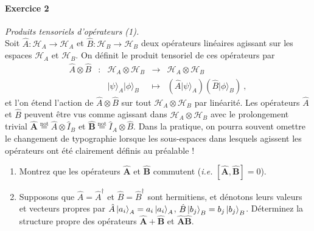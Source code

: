 \paragraph{Exercice 2} \textit{Produits tensoriels d'opérateurs (1).} \\
Soit $\hat A: \mathcal H_A \rightarrow \mathcal H_A$ et $\hat B: \mathcal H_B \rightarrow \mathcal H_B$ deux opérateurs linéaires agissant sur les espaces $\mathcal H_A$ et $\mathcal H_B$. On définit le produit tensoriel de ces opérateurs par
\begin{equation}
\begin{array}{ccccl}
\hat A \otimes \hat B &:& \mathcal H_A \otimes \mathcal H_B &\rightarrow& \mathcal H_A \otimes \mathcal H_B \\
& & \vert \psi \rangle_A \vert \phi \rangle_B &\mapsto &
\left( \hat A \vert \psi \rangle_A \right) \left( \hat B \vert \phi \rangle_B \right)\ , 
\end{array}
\end{equation}
et l'on étend l'action de $\hat A \otimes \hat B $ sur tout $\mathcal H_A \otimes \mathcal H_B $ par linéarité. Les opérateurs $\hat A$ et $\hat B$ peuvent être vus comme agissant dans $\mathcal H_A \otimes \mathcal H_B$ avec le prolongement trivial $\hat{\bm A} \stackrel{\text{not}}{=} \hat A \otimes \hat I_B$ et $\hat{\bm B} \stackrel{\text{not}}{=} \hat I_A \otimes \hat B$. Dans la pratique, on pourra souvent omettre le changement de typographie lorsque les sous-espaces dans lesquels agissent les opérateurs ont été clairement définis au préalable !
\begin{enumerate}
\item Montrez que les opérateurs $\hat{\bm A}$ et $\hat{\bm B}$ commutent (\textit{i.e.} $[\hat{\bm A},\hat{\bm B}]=0$).
\item Supposons que $\hat A=\hat A^\dagger$ et $\hat B=\hat B^\dagger$ sont hermitiens, et dénotons leurs valeurs et vecteurs propres par $\hat A \ket{a_i}_A = a_i \ket{a_i}_A$, $\hat B \ket{b_j}_B = b_j \ket{b_j}_B$. Déterminez la structure propre des opérateurs $\hat{\bm A}+\hat{\bm B}$ et $\hat{\bm A}\hat{\bm B}$.
\end{enumerate}

